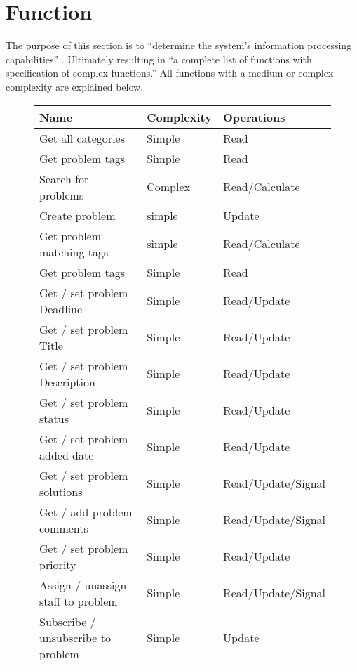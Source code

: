 \section{Function}
\label{sec:function}

The purpose of this section is to ``determine the system's information processing capabilities'' \cite[p.~137]{roedeaalborg}. Ultimately resulting in ``a complete list of functions with specification of complex functions.'' \cite[p.~137]{roedeaalborg} 
All functions with a medium or complex complexity are explained below.



\begin{figure}[hpt] %
\begin{center}
\begin{tabular}{|l|l|l|}
\hline
\textbf{Name}								&\textbf{Complexity} & \textbf{Operations}   \\ \hline%
Get all categories 					&   Simple & Read   \\ \hline%
Get problem tags						&   Simple & Read   \\ \hline%
Search for problems 				&  Complex & Read/Calculate   \\ \hline%
Create problem 							&   simple & Update   \\ \hline%
Get problem matching tags 	&   simple & Read/Calculate   \\ \hline%
Get problem tags 						&   Simple & Read   \\ \hline%
Get / set problem Deadline 	&   Simple & Read/Update  \\ \hline%
Get / set problem Title 		&   Simple & Read/Update   \\ \hline%
Get / set problem Description & Simple & Read/Update   \\ \hline%
Get / set problem status 		&   Simple & Read/Update   \\ \hline%
Get / set problem added date& 	Simple & Read/Update   \\ \hline%
Get / set problem solutions &   Simple & Read/Update/Signal   \\ \hline%
Get / add problem comments 	&   Simple & Read/Update/Signal   \\ \hline%
Get / set problem priority 	&   Simple & Read/Update   \\ \hline%
Assign / unassign  staff to problem 	&   Simple & Read/Update/Signal   \\ \hline%
Subscribe / unsubscribe  to problem 	&   Simple & Update   \\ \hline%

\end{tabular}
\end{center}
\end{figure}
